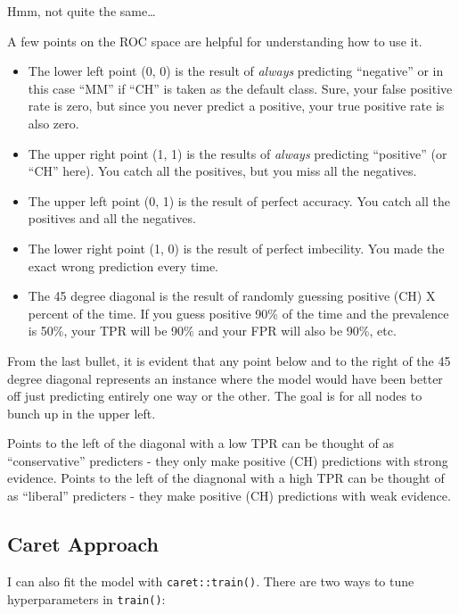 \documentclass[]{book}
\providecommand{\tightlist}{%
  \setlength{\itemsep}{0pt}\setlength{\parskip}{0pt}}
\begin{document}
Hmm, not quite the same\ldots{}

A few points on the ROC space are helpful for understanding how to use it.

\begin{itemize}
\tightlist
\item
  The lower left point (0, 0) is the result of \emph{always} predicting ``negative'' or in this case ``MM'' if ``CH'' is taken as the default class. Sure, your false positive rate is zero, but since you never predict a positive, your true positive rate is also zero.\\
\item
  The upper right point (1, 1) is the results of \emph{always} predicting ``positive'' (or ``CH'' here). You catch all the positives, but you miss all the negatives.
\item
  The upper left point (0, 1) is the result of perfect accuracy. You catch all the positives and all the negatives.
\item
  The lower right point (1, 0) is the result of perfect imbecility. You made the exact wrong prediction every time.
\item
  The 45 degree diagonal is the result of randomly guessing positive (CH) X percent of the time. If you guess positive 90\% of the time and the prevalence is 50\%, your TPR will be 90\% and your FPR will also be 90\%, etc.
\end{itemize}

From the last bullet, it is evident that any point below and to the right of the 45 degree diagonal represents an instance where the model would have been better off just predicting entirely one way or the other. The goal is for all nodes to bunch up in the upper left.

Points to the left of the diagonal with a low TPR can be thought of as ``conservative'' predicters - they only make positive (CH) predictions with strong evidence. Points to the left of the diagnonal with a high TPR can be thought of as ``liberal'' predicters - they make positive (CH) predictions with weak evidence.

\hypertarget{caret-approach}{%
\subsection{Caret Approach}\label{caret-approach}}

I can also fit the model with \texttt{caret::train()}. There are two ways to tune hyperparameters in \texttt{train()}:
\end{document}
